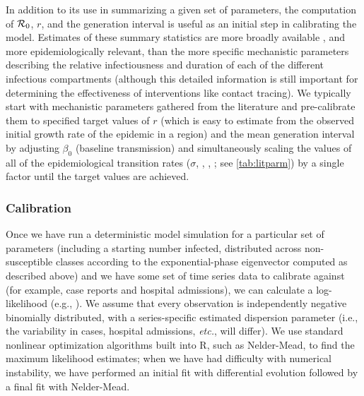 \documentclass[12pt]{article}\usepackage[]{graphicx}\usepackage[]{color}
\begin{document}
In addition to its use in summarizing a given set of parameters, the computation of ${\mathcal R}_0$, $r$, and the generation interval is useful as an initial step in calibrating the model. 
Estimates of these summary statistics are more broadly available \cite{park2020reconciling}, and more epidemiologically relevant, than the more specific mechanistic parameters describing the relative infectiousness and duration of each of the different infectious compartments (although this detailed information is still important for determining the effectiveness of interventions like contact tracing). 
We typically start with mechanistic parameters gathered from the literature and pre-calibrate them to specified target values of $r$ (which is easy to estimate from the observed initial growth rate of the epidemic in a region) and the mean generation interval by adjusting $\beta_0$ (baseline transmission) and simultaneously scaling the values of all of the epidemiological transition rates ($\sigma$, , , ;
see \cref{tab:litparm})
by a single factor until the target values are achieved.

\subsubsection*{Calibration}

Once we have run a deterministic model simulation for a particular set of parameters (including a starting number infected, distributed across non-susceptible classes according to the exponential-phase eigenvector computed as described above) and we have some set of time series data to calibrate against (for example, case reports and hospital admissions), we can calculate a log-likelihood (e.g., \cite{Bolk08}). 
We assume that every observation is independently negative binomially distributed, with a series-specific estimated dispersion parameter (i.e., the variability in cases, hospital admissions, \emph{etc.}, will differ). 
We use standard nonlinear optimization algorithms built into R, such as Nelder-Mead, to find the maximum likelihood estimates; when we have had difficulty with numerical instability, we have performed an initial fit with differential evolution \cite{Mull+11} followed by a final fit with Nelder-Mead.  
\end{document}
